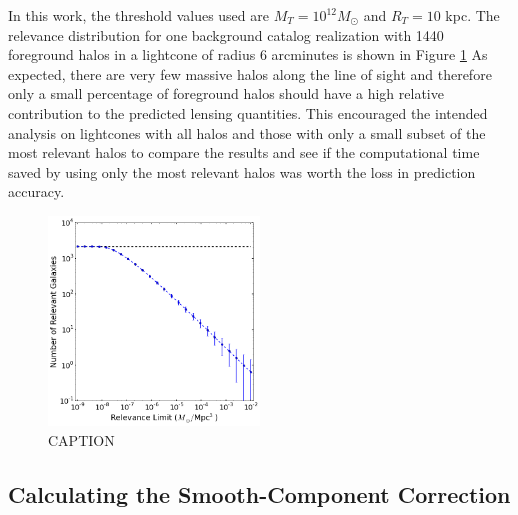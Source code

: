 \documentclass[%
 reprint,
 amsmath,amssymb,
 aps,nofootinbib
]{revtex4-1}
\begin{document}
In this work, the threshold values used are ${M_T=10^{12}M_\odot}$ and ${R_T=10}$ kpc. The relevance distribution for one background catalog realization with 1440 foreground halos in a lightcone of radius 6 arcminutes is shown in Figure \ref{fig:rel_dist} As expected, there are very few massive halos along the line of sight and therefore only a small percentage of foreground halos should have a high relative contribution to the predicted lensing quantities. This encouraged the intended analysis on lightcones with all halos and those with only a small subset of the most relevant halos to compare the results and see if the computational time saved by using only the most relevant halos was worth the loss in prediction accuracy.

\begin{figure}
    \centering
    \includegraphics[width=0.5\textwidth]{figs-swe/thesis/relevance_distribution.png}
    \captionsetup{justification=raggedright,singlelinecheck=false}
    \caption{CAPTION}
    \label{fig:rel_dist}
\end{figure}


\subsection{Calculating the Smooth-Component Correction} \label{calc_scc}
\end{document}

